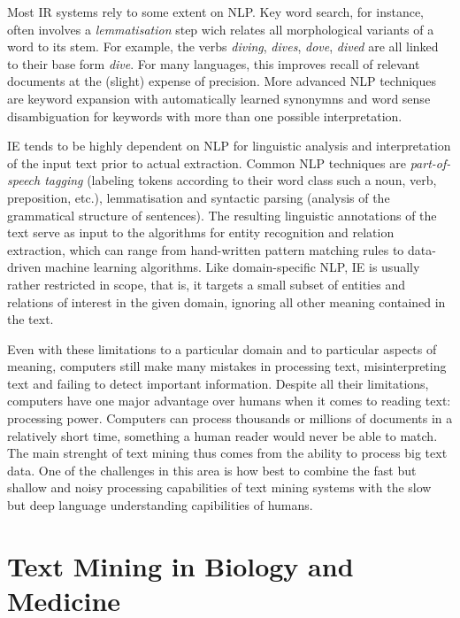 \documentclass[11pt,oneside,a4paper]{report}
\begin{document}
Most IR systems rely to some extent on NLP.
Key word search, for instance, often involves a \emph{lemmatisation} step wich relates all morphological variants of a word to its stem.
For example, the verbs \emph{diving}, \emph{dives}, \emph{dove}, \emph{dived} are all linked to their base form \emph{dive}.
For many languages, this improves recall of relevant documents at the (slight) expense of precision.
More advanced NLP techniques are keyword expansion with automatically learned synonymns and word sense disambiguation for keywords with more than one possible interpretation.  

IE tends to be highly dependent on NLP for linguistic analysis and interpretation of the input text prior to actual extraction.
Common NLP techniques are \emph{part-of-speech tagging} (labeling tokens according to their word class such a noun, verb, preposition, etc.), lemmatisation and syntactic parsing (analysis of the grammatical structure of sentences).
The resulting linguistic annotations of the text serve as input to the algorithms for entity recognition and relation extraction, which can range from hand-written pattern matching rules to data-driven machine learning algorithms.
Like domain-specific NLP, IE is usually rather restricted in scope, that is, it targets a small subset of entities and relations of interest in the given domain, ignoring all other meaning contained in the text.    

Even with these limitations to a particular domain and to particular aspects of meaning, computers still make many mistakes in processing text, misinterpreting text and failing to detect important information.
Despite all their limitations, computers have one major advantage over humans when it comes to reading text: processing power. 
Computers can process thousands or millions of documents in a relatively short time, something a human reader would never be able to match.
The main strenght of text mining thus comes from the ability to process big text data.
One of the challenges in this area is how best to combine the fast but shallow and noisy processing capabilities of text mining systems with the slow but deep language understanding capibilities of humans.

\section{Text Mining in Biology and Medicine}
\end{document}
